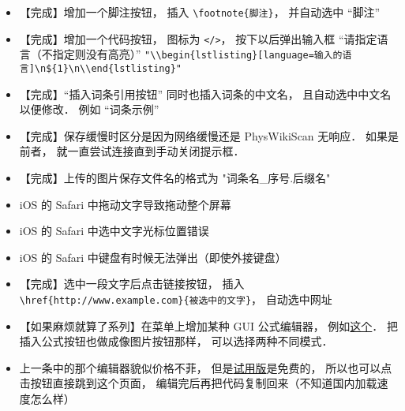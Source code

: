 \begin{itemize}
\item 【完成】增加一个脚注按钮， 插入 \lstinline|\footnote{脚注}|， 并自动选中 “脚注”

\item 【完成】增加一个代码按钮， 图标为 \lstinline|</>|， 按下以后弹出输入框 “请指定语言（不指定则没有高亮）” \lstinline|"\\begin{lstlisting}[language=输入的语言]\n${1}\n\\end{lstlisting}"|

\item 【完成】“插入词条引用按钮” 同时也插入词条的中文名， 且自动选中中文名以便修改． 例如 “词条示例”

\item 【完成】保存缓慢时区分是因为网络缓慢还是 PhysWikiScan 无响应． 如果是前者， 就一直尝试连接直到手动关闭提示框．

\item 【完成】上传的图片保存文件名的格式为 "词条名_序号.后缀名"

\item iOS 的 Safari 中拖动文字导致拖动整个屏幕

\item iOS 的 Safari 中选中文字光标位置错误

\item iOS 的 Safari 中键盘有时候无法弹出（即使外接键盘）

\item 【完成】选中一段文字后点击链接按钮， 插入 \lstinline|\href{http://www.example.com}{被选中的文字}|， 自动选中网址

\item 【如果麻烦就算了系列】在菜单上增加某种 GUI 公式编辑器， 例如\href{http://latex.codecogs.com/eqneditor/editor.php}{这个}． 把插入公式按钮也做成像图片按钮那样， 可以选择两种不同模式．

\item 上一条中的那个编辑器貌似价格不菲， 但是\href{https://www.codecogs.com/latex/eqneditor.php?lang=zh-cn}{试用版}是免费的， 所以也可以点击按钮直接跳到这个页面， 编辑完后再把代码复制回来（不知道国内加载速度怎么样）


\end{itemize}
